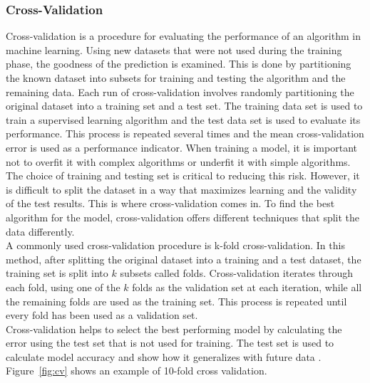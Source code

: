 \subsubsection*{Cross-Validation}
Cross-validation is a procedure for evaluating the performance of an algorithm in machine learning. Using new datasets that were not used during the training phase, the goodness of the prediction is examined. This is done by partitioning the known dataset into subsets for training and testing the algorithm and the remaining data.
Each run of cross-validation involves randomly partitioning the original dataset into a training set and a test set. The training data set is used to train a supervised learning algorithm and the test data set is used to evaluate its performance. This process is repeated several times and the mean cross-validation error is used as a performance indicator.
When training a model, it is important not to overfit it with complex algorithms or underfit it with simple algorithms. The choice of training and testing set is critical to reducing this risk. However, it is difficult to split the dataset in a way that maximizes learning and the validity of the test results. This is where cross-validation comes in. To find the best algorithm for the model, cross-validation offers different techniques that split the data differently. \\
A commonly used cross-validation procedure is k-fold cross-validation. In this method, after splitting the original dataset into a training and a test dataset, the training set is split into $k$ subsets called folds. Cross-validation iterates through each fold, using one of the $k$ folds as the validation set at each iteration, while all the remaining folds are used as the training set. This process is repeated until every fold has been used as a validation set. \\
Cross-validation helps to select the best performing model by calculating the error using the test set that is not used for training. The test set is used to calculate model accuracy and show how it generalizes with future data \autocite[][]{fushiki2011estimation}. Figure~\ref{fig:cv} shows an example of 10-fold cross validation.

